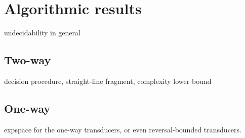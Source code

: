 
\section{Algorithmic results}
\label{sec:algo}

undecidability in general

\subsection{Two-way}

decision procedure, straight-line fragment, complexity lower bound

\subsection{One-way}

expspace for the one-way transducers, or even reversal-bounded transducers.

